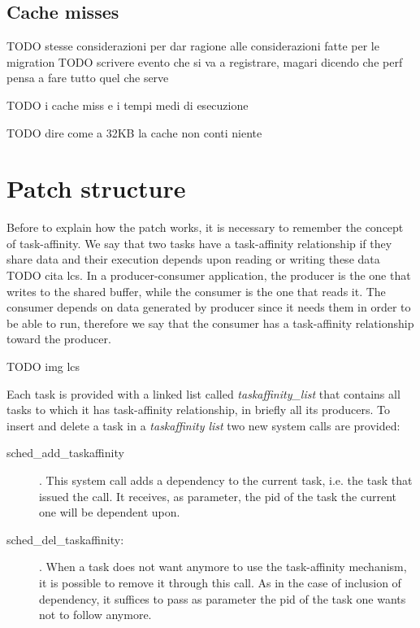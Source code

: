 \subsection{Cache misses}

TODO stesse considerazioni per dar ragione alle considerazioni fatte per le migration
TODO scrivere evento che si va a registrare, magari dicendo che perf pensa a fare tutto quel che serve 

TODO i cache miss e i tempi medi di esecuzione

TODO dire come a 32KB la cache non conti niente

\section{Patch structure}

Before to explain how the patch works, it is necessary to remember the concept of task-affinity. We say that two tasks have a task-affinity relationship if 
they share data and their execution depends upon reading or writing these data TODO cita lcs. In a producer-consumer application, the producer 
is the one that writes to the shared buffer, while the consumer is the one that reads it. The consumer depends on data generated by producer since it needs 
them in order to be able to run, therefore we say that the consumer has a task-affinity relationship toward the producer.

TODO img lcs

Each task is provided with a linked list called \textit{taskaffinity\_list} that contains all tasks to which it has task-affinity relationship, in briefly 
all its producers. To insert and delete a task in a \textit{taskaffinity list} two new system calls are provided:

\begin{description}

\item[sched\_add\_taskaffinity]. This system call adds a dependency to the current task, i.e. the task that issued the call. It receives, as parameter, the 
pid of the task the current one will be dependent upon.

\item[sched\_del\_taskaffinity:]. When a task does not want anymore to use the task-affinity mechanism, it is possible to remove it through this call.
As in the case of inclusion of dependency, it suffices to pass as parameter the pid of the task one wants not to follow anymore.

\end{description}

